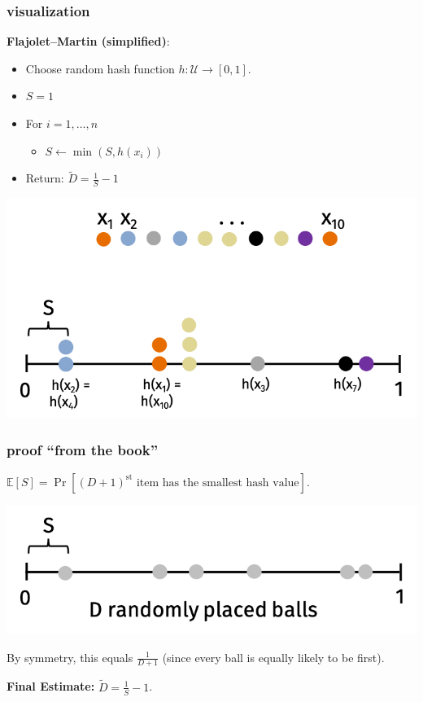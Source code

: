 \documentclass[compress]{beamer}
\newcommand{\E}{\mathbb{E}}
\begin{document}
\begin{frame}
	\frametitle{visualization}
	\small
	\textbf{Flajolet–Martin (simplified)}:
	\vspace{-.5em}
	\begin{itemize}
		\item Choose random hash function $h: \mathcal{U} \rightarrow [0,1]$.
		\vspace{-.25em}
		\item $S = 1$ 
		\vspace{-.25em}
		\item For $i = 1, \ldots, n$
		\vspace{-.25em}
		\begin{itemize}
			\vspace{-.25em}
			\item $S \leftarrow \min(S, h(x_i))$
		\end{itemize} 
		\vspace{-.25em}
		\item Return: $\tilde{D} = \frac{1}{S} - 1$
	\end{itemize}
\vspace{-.5em}
	\begin{center}
	\includegraphics[width=.75\textwidth]{better_minhash_cut.png}
	\end{center}
\end{frame}


\begin{frame}
	\frametitle{proof ``from the book''}
	$\E[S] = \Pr[(D+1)^\text{st} \text{ item has the smallest hash value}]$.
	\begin{center}
			\includegraphics[width=.6\textwidth]{FMimage.png}
	\end{center}
	By symmetry, this equals $\frac{1}{D+1}$ (since every ball is equally likely to be first). 

	\textbf{Final Estimate:} $\tilde{D} = \frac{1}{S} - 1$.
	
\end{frame}
\end{document}
